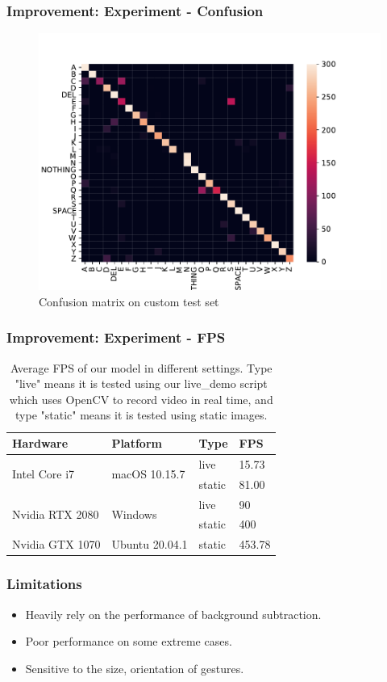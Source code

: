 \documentclass[handout]{beamer}
\begin{document}
\begin{frame}
\frametitle{Improvement: Experiment - Confusion}

\begin{figure}[h]
\begin{center}
\includegraphics[width=0.7\linewidth]{imgs/confusion}
\end{center}
   \caption{Confusion matrix on custom test set}
\label{fig:confusion}
\end{figure}

\end{frame}

\begin{frame}
\frametitle{Improvement: Experiment - FPS}

\begin{table}
\begin{center}
\begin{tabular}{|l|l|l|l|}
\hline
Hardware              & Platform                & Type   & FPS \\ \hline\hline
\multirow{2}{*}{Intel Core i7}   & \multirow{2}{*}{macOS 10.15.7}  & live   & 15.73  \\ \cline{3-4} 
                      &                         & static & 81.00  \\ \hline
\multirow{2}{*}{Nvidia RTX 2080} & \multirow{2}{*}{Windows} & live   & 90  \\ \cline{3-4} 
                      &                         & static & 400 \\ \hline
Nvidia GTX 1070 & Ubuntu 20.04.1 & static & 453.78 \\ \hline                    
\end{tabular}
\end{center}
\caption{Average FPS of our model in different settings. Type "live" means it is tested using our live\_demo script which uses OpenCV to record video in real time, and type "static" means it is tested using static images.}
\label{table:fps}
\end{table}

\end{frame}

\begin{frame}
\frametitle{Limitations}

\begin{itemize}
	\item Heavily rely on the performance of background subtraction.
	\item Poor performance on some extreme cases.
	\item Sensitive to the size, orientation of gestures. 
\end{itemize}

\end{frame}
\end{document}
